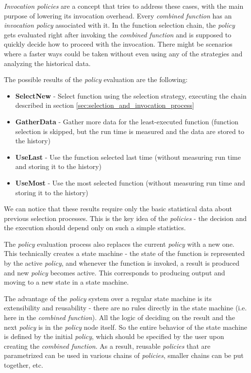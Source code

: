 \textit{Invocation policies} are a concept that tries to address these cases, with the main purpose of lowering its invocation overhead. Every \textit{combined function} has an \textit{invocation policy} associated with it. In the function selection chain, the \textit{policy} gets evaluated right after invoking the \textit{combined function} and is supposed to quickly decide how to proceed with the invocation. There might be scenarios where a faster ways could be taken without even using any of the strategies and analyzing the historical data.

The possible results of the \textit{policy} evaluation are the following:

\begin{itemize}
	\item \textbf{SelectNew} - Select function using the selection strategy, executing the chain described in section \ref{sec:selection_and_invocation_process}
	\item \textbf{GatherData} - Gather more data for the least-executed function (function selection is skipped, but the run time is measured and the data are stored to the history)
	\item \textbf{UseLast} - Use the function selected last time (without measuring run time and storing it to the history)
	\item \textbf{UseMost} - Use the most selected function (without measuring run time and storing it to the history)
\end{itemize}

We can notice that these results require only the basic statistical data about previous selection processes. This is the key idea of the \textit{policies} - the decision and the execution should depend only on such a simple statistics.

The \textit{policy} evaluation process also replaces the current \textit{policy} with a new one. This technically creates a state machine - the state of the function is represented by the active \textit{policy}, and whenever the function is invoked, a result is produced and new \textit{policy} becomes active. This corresponds to producing output and moving to a new state in a state machine.

The advantage of the \textit{policy} system over a regular state machine is its extensibility and reusability - there are no rules directly in the state machine (i.e. here in the \textit{combined function}). All the logic of deciding on the result and the next \textit{policy} is in the \textit{policy} node itself. So the entire behavior of the state machine is defined by the initial \textit{policy}, which should be specified by the user upon creating the \textit{combined function}. As a result, reusable \textit{policies} that are parametrized can be used in various chains of \textit{policies}, smaller chains can be put together, etc.

